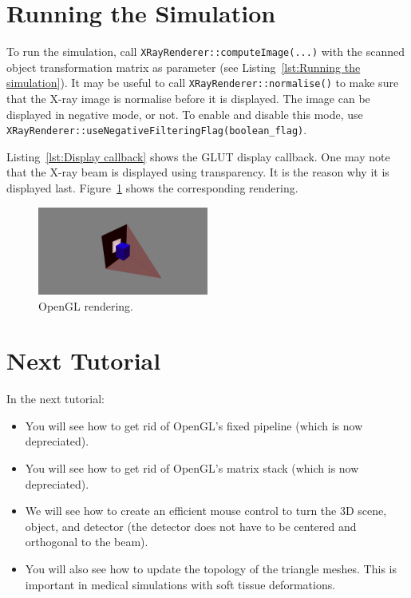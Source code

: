 \documentclass[11pt,oneside,a4paper,final]{article}
\begin{document}
\newpage
\section{Running the Simulation}



To run the simulation, call \verb+XRayRenderer::computeImage(...)+ with the scanned object transformation matrix as parameter (see Listing~\ref{lst:Running the simulation}). 
It may be useful to call \verb+XRayRenderer::normalise()+ to make sure that the X-ray image is normalise before it is displayed. 
The image can be displayed in negative mode, or not. 
To enable and disable this mode, use \verb+XRayRenderer::useNegativeFilteringFlag(boolean_flag)+.


Listing~\ref{lst:Display callback} shows the \Gls{GLUT} display callback. 
One may note that the X-ray beam is displayed using transparency. 
It is the reason why it is displayed last. 
Figure~\ref{fig:tutorial 01 screenshot} shows the corresponding rendering.
\begin{figure}[tbh]
 \centering
 \includegraphics[width=0.5\textwidth]{tutorial_01.png}
 \caption{\label{fig:tutorial 01 screenshot} OpenGL rendering.}
\end{figure}

\section{Next Tutorial}

In the next tutorial:
\begin{itemize}
 \item  You will see how to get rid of OpenGL's fixed pipeline (which is now depreciated). 
 
 \item You will see how to get rid of OpenGL's matrix stack (which is now depreciated).

 \item We will see how to create an efficient mouse control to turn the \Acrshort{3D} scene, object, and detector (the detector does not have to be centered and orthogonal to the beam). 

 \item You will also see how to update the topology of the triangle meshes. 
 This is important in medical simulations with soft tissue deformations. 
\end{itemize}

\newpage
\printglossary[type=\acronymtype] 

\end{document}
